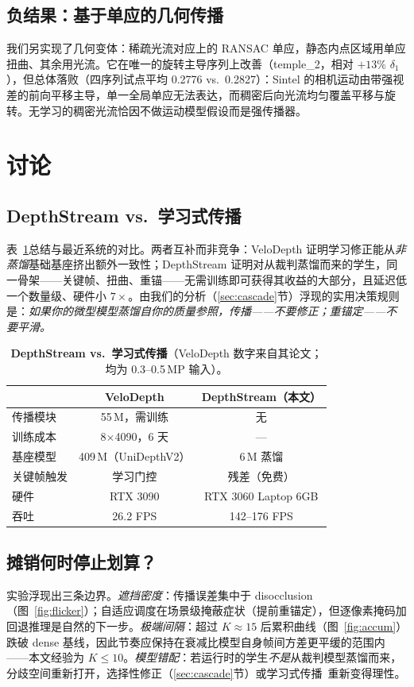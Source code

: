 \documentclass[10pt,twocolumn]{article}
\begin{document}
\subsection{负结果：基于单应的几何传播}
我们另实现了几何变体：稀疏光流对应上的 RANSAC 单应，静态内点区域用单应扭曲、其余用光流。它在唯一的旋转主导序列上改善（temple\_2，相对 $+13\%$ $\delta_1$），但总体落败（四序列试点平均 0.2776 vs.\ 0.2827）：Sintel 的相机运动由带强视差的前向平移主导，单一全局单应无法表达，而稠密后向光流均匀覆盖平移与旋转。无学习的稠密光流恰因不做运动模型假设而是强传播器。

\section{讨论}
\label{sec:discussion}

\subsection{DepthStream vs.\ 学习式传播}
表~\ref{tab:velodepth}总结与最近系统的对比。两者互补而非竞争：VeloDepth 证明学习修正能从\emph{非蒸馏}基础基座挤出额外一致性；DepthStream 证明对从裁判蒸馏而来的学生，同一骨架——关键帧、扭曲、重锚——无需训练即可获得其收益的大部分，且延迟低一个数量级、硬件小 $7\times$。由我们的分析（\ref{sec:cascade}节）浮现的实用决策规则是：\emph{如果你的微型模型蒸馏自你的质量参照，传播——不要修正；重锚定——不要平滑。}

\begin{table}[t]
\centering\small
\caption{\textbf{DepthStream vs.\ 学习式传播}（VeloDepth 数字来自其论文；均为 0.3--0.5\,MP 输入）。}
\label{tab:velodepth}
\begin{tabular}{lcc}
\toprule
 & VeloDepth & DepthStream（本文）\\
\midrule
传播模块 & 55\,M，需训练 & 无\\
训练成本 & 8$\times$4090，6 天 & ---\\
基座模型 & 409\,M（UniDepthV2） & 6\,M 蒸馏\\
关键帧触发 & 学习门控 & 残差（免费）\\
硬件 & RTX 3090 & RTX 3060 Laptop 6GB\\
吞吐 & 26.2 FPS & 142--176 FPS\\
\bottomrule
\end{tabular}
\end{table}

\subsection{摊销何时停止划算？}
实验浮现出三条边界。\emph{遮挡密度}：传播误差集中于 disocclusion（图~\ref{fig:flicker}）；自适应调度在场景级掩蔽症状（提前重锚定），但逐像素掩码加回退推理是自然的下一步。\emph{极端间隔}：超过 $K{\approx}15$ 后累积曲线（图~\ref{fig:accum}）跌破 dense 基线，因此节奏应保持在衰减比模型自身帧间方差更平缓的范围内——本文经验为 $K{\leq}10$。\emph{模型错配}：若运行时的学生\emph{不是}从裁判模型蒸馏而来，分歧空间重新打开，选择性修正（\ref{sec:cascade}节）或学习式传播~\cite{velodepth}重新变得理性。
\end{document}
